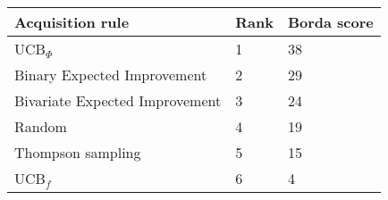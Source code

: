 \begin{tabular}{lll}
Acquisition rule & Rank & Borda score \\ 
\hline 
UCB$_\Phi$                                    & 1 & 38 \\ 
Binary Expected Improvement \citep{Tesch2013} & 2 & 29 \\ 
Bivariate Expected Improvement                & 3 & 24 \\ 
Random                                        & 4 & 19 \\ 
Thompson sampling                             & 5 & 15 \\ 
UCB$_f$ \citep{Tesch2013}                     & 6 & 4 \\ 
\hline 
\end{tabular}